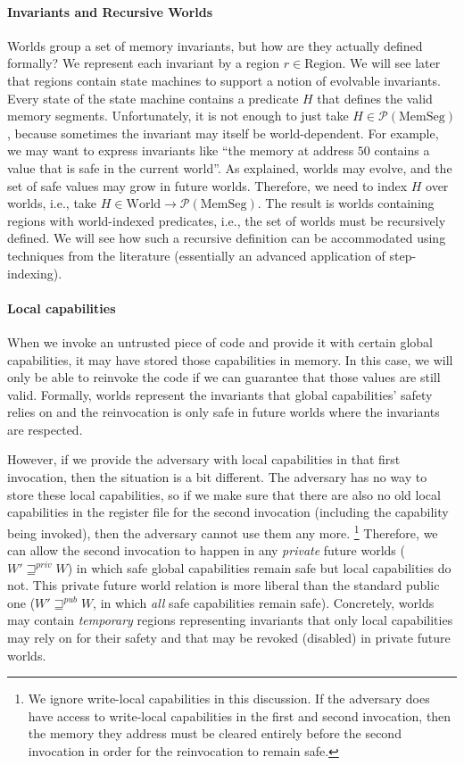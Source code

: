 \documentclass[format=acmsmall, review=true, screen=true]{acmart}
\newcommand{\powerset}[1]{\mathcal{P}(#1)}
\newcommand{\var}[1]{\mathit{#1}}
\newcommand{\futurewk}{\mathbin{\sqsupseteq}^{\var{pub}}}
\newcommand{\futurestr}{\mathbin{\sqsupseteq}^{\var{priv}}}
\newcommand{\plaindom}[1]{\mathrm{#1}}
\newcommand{\HeapSegments}{\plaindom{MemSeg}}
\newcommand{\MemSegments}{\HeapSegments}
\newcommand{\Regions}{\plaindom{Region}}
\newcommand{\Worlds}{\plaindom{World}}
\newenvironment{toplas}%
    {\color{OliveGreen}}{}
\begin{document}
\begin{toplas}
\paragraph{Invariants and Recursive Worlds}
Worlds group a set of memory invariants, but how are they actually
defined formally? We represent each invariant by a region
$r \in \Regions$. We will see later that regions contain state
machines to support a notion of evolvable invariants. Every
state of the state machine contains a predicate $H$ that defines the valid
memory segments.
Unfortunately, it is not enough to just take
$H \in \powerset{\MemSegments}$, because sometimes the invariant may
itself be world-dependent. For example, we may want to express
invariants like ``the memory at address $50$ contains a value that is
safe in the current world''. As explained, worlds may evolve, and the
set of safe values may grow in future worlds. Therefore, we need to
index $H$ over worlds, i.e., take
$H \in \Worlds \rightarrow \powerset{\MemSegments}$. The result is worlds containing regions with world-indexed predicates,
i.e., the set of worlds must be recursively defined. We will see how such a recursive
definition can be accommodated using techniques from the
literature (essentially an advanced application of step-indexing).

\paragraph{Local capabilities}
When we invoke an untrusted piece of code and provide it with certain global capabilities, it may have stored those capabilities in memory.
In this case, we will only be able to reinvoke the code if we can guarantee that those values are still valid.
Formally, worlds represent the invariants that global capabilities' safety relies on and the reinvocation is only safe in future worlds where the invariants are respected.

However, if we provide the adversary with local capabilities in that first invocation, then the situation is a bit different. The adversary has no way to store these local capabilities, so if we make sure that there are also no old local capabilities in the register file for the second invocation (including the capability being invoked), then the adversary cannot use them any more.%
\footnote{We ignore write-local capabilities in this discussion.
  If the adversary does have access to write-local capabilities in the first and second invocation, then the memory they address must be cleared entirely before the second invocation in order for the reinvocation to remain safe.}
Therefore, we can allow the second invocation to happen in any \emph{private} future worlds ($W' \futurestr W$) in which safe global capabilities remain safe but local capabilities do not.
This private future world relation is more liberal than the standard public one ($W' \futurewk W$, in which \emph{all} safe capabilities remain safe).
Concretely, worlds may contain \emph{temporary} regions representing invariants that only local capabilities may rely on for their safety and that may be revoked (disabled) in private future worlds.


\end{toplas}
\end{document}

